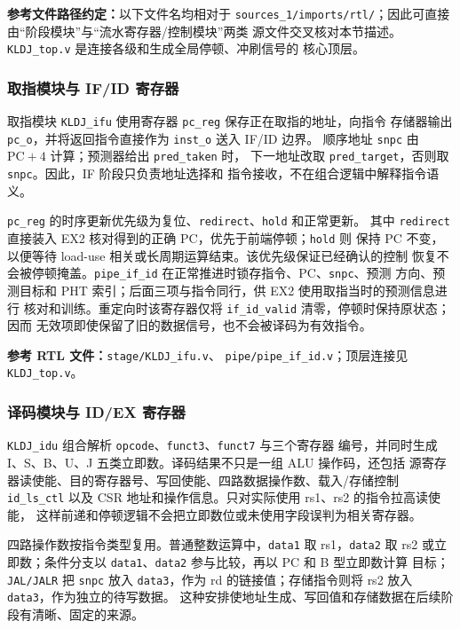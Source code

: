 \documentclass[UTF8,zihao=-4,a4paper]{ctexart}
\numberwithin{table}{section}
\numberwithin{figure}{section}
\newcommand{\code}[1]{\texttt{#1}}
\begin{document}
\noindent\textbf{参考文件路径约定：}以下文件名均相对于
\code{sources\_1/imports/rtl/}；因此可直接由“阶段模块”与“流水寄存器/控制模块”两类
源文件交叉核对本节描述。\code{KLDJ\_top.v} 是连接各级和生成全局停顿、冲刷信号的
核心顶层。

\subsubsection{取指模块与 IF/ID 寄存器}

取指模块 \code{KLDJ\_ifu} 使用寄存器 \code{pc\_reg} 保存正在取指的地址，向指令
存储器输出 \code{pc\_o}，并将返回指令直接作为 \code{inst\_o} 送入 IF/ID 边界。
顺序地址 \code{snpc} 由 \(\mathrm{PC}+4\) 计算；预测器给出 \code{pred\_taken} 时，
下一地址改取 \code{pred\_target}，否则取 \code{snpc}。因此，IF 阶段只负责地址选择和
指令接收，不在组合逻辑中解释指令语义。

\code{pc\_reg} 的时序更新优先级为复位、\code{redirect}、\code{hold} 和正常更新。
其中 \code{redirect} 直接装入 EX2 核对得到的正确 PC，优先于前端停顿；\code{hold} 则
保持 PC 不变，以便等待 load-use 相关或长周期运算结束。该优先级保证已经确认的控制
恢复不会被停顿掩盖。\code{pipe\_if\_id} 在正常推进时锁存指令、PC、\code{snpc}、预测
方向、预测目标和 PHT 索引；后面三项与指令同行，供 EX2 使用取指当时的预测信息进行
核对和训练。重定向时该寄存器仅将 \code{if\_id\_valid} 清零，停顿时保持原状态；因而
无效项即使保留了旧的数据信号，也不会被译码为有效指令。

\noindent\textbf{参考 RTL 文件：}\code{stage/KLDJ\_ifu.v}、
\code{pipe/pipe\_if\_id.v}；顶层连接见 \code{KLDJ\_top.v}。

\subsubsection{译码模块与 ID/EX 寄存器}

\code{KLDJ\_idu} 组合解析 \code{opcode}、\code{funct3}、\code{funct7} 与三个寄存器
编号，并同时生成 I、S、B、U、J 五类立即数。译码结果不只是一组 ALU 操作码，还包括
源寄存器读使能、目的寄存器号、写回使能、四路数据操作数、载入/存储控制
\code{id\_ls\_ctl} 以及 CSR 地址和操作信息。只对实际使用 rs1、rs2 的指令拉高读使能，
这样前递和停顿逻辑不会把立即数位或未使用字段误判为相关寄存器。

四路操作数按指令类型复用。普通整数运算中，\code{data1} 取 rs1，\code{data2} 取 rs2
或立即数；条件分支以 \code{data1}、\code{data2} 参与比较，再以 PC 和 B 型立即数计算
目标；\code{JAL/JALR} 把 \code{snpc} 放入 \code{data3}，作为 rd 的链接值；存储指令则将
rs2 放入 \code{data3}，作为独立的待写数据。
这种安排使地址生成、写回值和存储数据在后续阶段有清晰、固定的来源。
\end{document}
